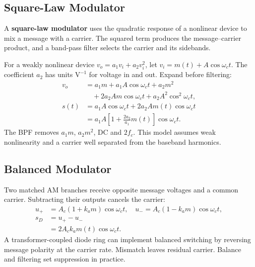 \documentclass[12pt,a4paper]{article}
\begin{document}
\begin{tcolorbox}[tikzbox, unbreakable, title={Gated and Square-Law AM Generation}]
\centering
{}\par
\end{tcolorbox}

\subsection{Square-Law Modulator}
\begin{tcolorbox}[defbox, title={Square-Law Modulator}]
A \textbf{square-law modulator} uses the quadratic response of a nonlinear device to mix a message with a carrier. The squared term produces the message--carrier product, and a band-pass filter selects the carrier and its sidebands.
\end{tcolorbox}

For a weakly nonlinear device $v_o=a_1v_i+a_2v_i^2$, let $v_i=m(t)+A\cos\omega_ct$. The coefficient $a_2$ has units $\mathrm{V^{-1}}$ for voltage in and out. Expand before filtering:
\[
\begin{aligned}
 v_o &= a_1m+a_1 A\cos\omega_ct+a_2m^2\\
     &\quad+2a_2Am\cos\omega_ct+a_2A^2\cos^2\omega_ct,\\
 s(t)&=a_1A\cos\omega_ct+2a_2Am(t)\cos\omega_ct\\
     &=a_1A\left[1+\frac{2a_2}{a_1}m(t)\right]\cos\omega_ct.
\end{aligned}
\]
The BPF removes $a_1m$, $a_2m^2$, DC and $2f_c$. This model assumes weak nonlinearity and a carrier well separated from the baseband harmonics.

\subsection{Balanced Modulator}
Two matched AM branches receive opposite message voltages and a common carrier. Subtracting their outputs cancels the carrier:
\[
\begin{aligned}
 u_+&=A_c(1+k_am)\cos\omega_ct,\quad
 u_-=A_c(1-k_am)\cos\omega_ct,\\
 s_D&=u_+-u_-\\
    &=2A_ck_a m(t)\cos\omega_ct.
\end{aligned}
\]
A transformer-coupled diode ring can implement balanced switching by reversing message polarity at the carrier rate. Mismatch leaves residual carrier. Balance and filtering set suppression in practice.
\end{document}
